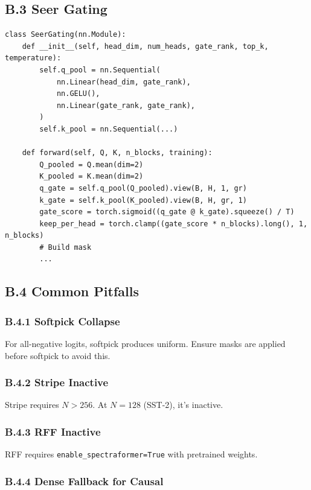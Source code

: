 \subsection{B.3 Seer Gating}

\begin{lstlisting}
class SeerGating(nn.Module):
    def __init__(self, head_dim, num_heads, gate_rank, top_k, temperature):
        self.q_pool = nn.Sequential(
            nn.Linear(head_dim, gate_rank),
            nn.GELU(),
            nn.Linear(gate_rank, gate_rank),
        )
        self.k_pool = nn.Sequential(...)
    
    def forward(self, Q, K, n_blocks, training):
        Q_pooled = Q.mean(dim=2)
        K_pooled = K.mean(dim=2)
        q_gate = self.q_pool(Q_pooled).view(B, H, 1, gr)
        k_gate = self.k_pool(K_pooled).view(B, H, gr, 1)
        gate_score = torch.sigmoid((q_gate @ k_gate).squeeze() / T)
        keep_per_head = torch.clamp((gate_score * n_blocks).long(), 1, n_blocks)
        # Build mask
        ...
\end{lstlisting}

\subsection{B.4 Common Pitfalls}

\subsubsection{B.4.1 Softpick Collapse}

For all-negative logits, softpick produces uniform. Ensure masks are applied 
before softpick to avoid this.

\subsubsection{B.4.2 Stripe Inactive}

Stripe requires $N > 256$. At $N = 128$ (SST-2), it's inactive.

\subsubsection{B.4.3 RFF Inactive}

RFF requires \texttt{enable\_spectraformer=True} with pretrained weights.

\subsubsection{B.4.4 Dense Fallback for Causal}

